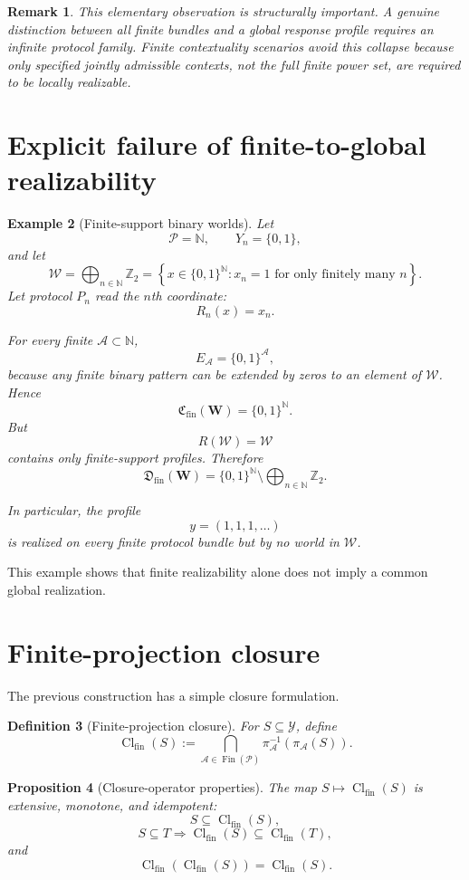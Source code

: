 \documentclass[11pt]{article}
\newtheorem{definition}{Definition}[section]
\newtheorem{proposition}[definition]{Proposition}
\newtheorem{example}[definition]{Example}
\newtheorem{remark}[definition]{Remark}
\newcommand{\W}{\mathcal W}
\newcommand{\Pcal}{\mathcal P}
\newcommand{\Acal}{\mathcal A}
\newcommand{\Y}{\mathcal Y}
\newcommand{\Fin}{\operatorname{Fin}}
\newcommand{\Cfin}{\mathfrak C_{\mathrm{fin}}}
\newcommand{\Dfin}{\mathfrak D_{\mathrm{fin}}}
\begin{document}
\begin{remark}
This elementary observation is structurally important. A genuine distinction
between \emph{all finite bundles} and a global response profile requires an
infinite protocol family. Finite contextuality scenarios avoid this collapse
because only specified jointly admissible contexts, not the full finite power
set, are required to be locally realizable.
\end{remark}

\section{Explicit failure of finite-to-global realizability}

\begin{example}[Finite-support binary worlds]\label{ex:finite-support}
Let
\[
\Pcal=\mathbb N,
\qquad
Y_n=\{0,1\},
\]
and let
\[
\W
=
\bigoplus_{n\in\mathbb N}\mathbb Z_2
=
\left\{
x\in\{0,1\}^{\mathbb N}:
x_n=1\text{ for only finitely many }n
\right\}.
\]
Let protocol $P_n$ read the $n$th coordinate:
\[
R_n(x)=x_n.
\]

For every finite $\Acal\subset\mathbb N$,
\[
E_{\Acal}=\{0,1\}^{\Acal},
\]
because any finite binary pattern can be extended by zeros to an element of
$\W$. Hence
\[
\Cfin(\mathbf W)=\{0,1\}^{\mathbb N}.
\]
But
\[
R(\W)=\W
\]
contains only finite-support profiles. Therefore
\[
\Dfin(\mathbf W)
=
\{0,1\}^{\mathbb N}\setminus
\bigoplus_{n\in\mathbb N}\mathbb Z_2.
\]

In particular, the profile
\[
y=(1,1,1,\ldots)
\]
is realized on every finite protocol bundle but by no world in $\W$.
\end{example}

This example shows that finite realizability alone does not imply a common
global realization.

\section{Finite-projection closure}

The previous construction has a simple closure formulation.

\begin{definition}[Finite-projection closure]
For $S\subseteq\Y$, define
\[
\operatorname{Cl}_{\mathrm{fin}}(S)
:=
\bigcap_{\Acal\in\Fin(\Pcal)}
\pi_{\Acal}^{-1}\!\left(\pi_{\Acal}(S)\right).
\]
\end{definition}

\begin{proposition}[Closure-operator properties]
The map $S\mapsto\operatorname{Cl}_{\mathrm{fin}}(S)$ is extensive,
monotone, and idempotent:
\[
S\subseteq\operatorname{Cl}_{\mathrm{fin}}(S),
\]
\[
S\subseteq T
\Longrightarrow
\operatorname{Cl}_{\mathrm{fin}}(S)
\subseteq
\operatorname{Cl}_{\mathrm{fin}}(T),
\]
and
\[
\operatorname{Cl}_{\mathrm{fin}}
\!\left(\operatorname{Cl}_{\mathrm{fin}}(S)\right)
=
\operatorname{Cl}_{\mathrm{fin}}(S).
\]
\end{proposition}
\end{document}
